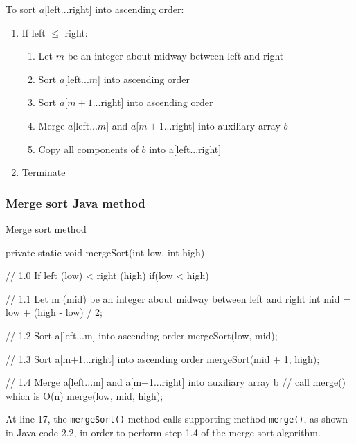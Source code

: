 To sort $a$[left...right] into ascending order:

\begin{enumerate}
\item If left $\leq$ right:
	\begin{enumerate}
	\item Let $m$ be an integer about midway between left and right
	\item Sort $a$[left...$m$] into ascending order
	\item Sort $a$[$m+1$...right] into ascending order
	\item Merge $a$[left...$m$] and $a$[$m+1$...right] into auxiliary array $b$
	\item Copy all components of $b$ into a[left...right]
	\end{enumerate}
\item Terminate
\end{enumerate}

\noindent
\citep[p. 54]{Watt2001}


\subsubsection{Merge sort Java method}

\begin{listing}[H]
\caption{Merge sort method}
\begin{javacode}
private static void mergeSort(int low, int high) {

    // 1.0 If left (low) < right (high)
    if(low < high) {

        // 1.1 Let m (mid) be an integer about midway between left and right
        int mid = low + (high - low) / 2;

        // 1.2 Sort a[left...m] into ascending order
        mergeSort(low, mid);

        // 1.3 Sort a[m+1...right] into ascending order
        mergeSort(mid + 1, high);

        // 1.4 Merge a[left...m] and a[m+1...right] into auxiliary array b
        // call merge() which is O(n)
        merge(low, mid, high);
    }
}
\end{javacode}
\end{listing}

\noindent
At line 17, the \texttt{mergeSort()} method calls supporting method \texttt{merge()}, as shown in Java code 2.2, in order to perform step 1.4 of the merge sort algorithm.

